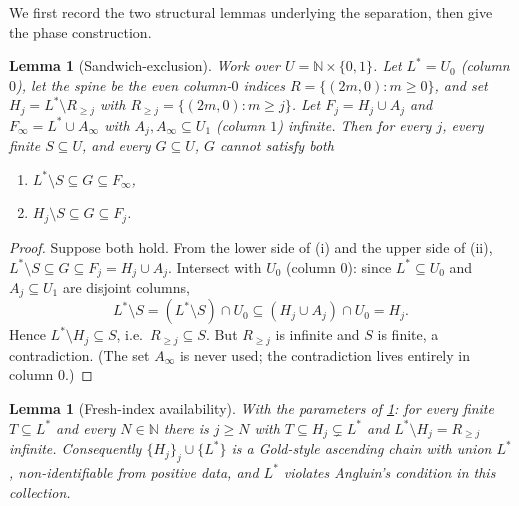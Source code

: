 \documentclass[11pt]{article}
\numberwithin{equation}{section}
\newcommand{\N}{\mathbb{N}}
\newcommand{\gnd}{U}
\newcommand{\Amb}{F}
\newcommand{\Val}{H}
\newcommand{\Seen}{S}
\theoremstyle{plain}
\newtheorem{lemma}[theorem]{Lemma}
\theoremstyle{definition}
\theoremstyle{remark}
\begin{document}
We first record the two structural lemmas underlying the separation, then give the phase
construction.

\begin{lemma}[Sandwich-exclusion]\label{lem:sandwich}
Work over $\gnd = \N \times \{0,1\}$. Let $L^* = \gnd_0$ (column $0$), let the spine be the
even column-$0$ indices $R = \{(2m, 0) : m \ge 0\}$, and set $\Val_j = L^* \setminus R_{\ge
j}$ with $R_{\ge j} = \{(2m, 0) : m \ge j\}$. Let $\Amb_j = \Val_j \cup A_j$ and $\Amb_\infty
= L^* \cup A_\infty$ with $A_j, A_\infty \subseteq \gnd_1$ (column $1$) infinite. Then for
every $j$, every finite $\Seen \subseteq \gnd$, and every $G \subseteq \gnd$, $G$ cannot
satisfy both
\begin{enumerate}[label=\textup{(\roman*)}]
  \item $L^* \setminus \Seen \subseteq G \subseteq \Amb_\infty$,
  \item $\Val_j \setminus \Seen \subseteq G \subseteq \Amb_j$.
\end{enumerate}
\end{lemma}

\begin{proof}
Suppose both hold. From the lower side of (i) and the upper side of (ii), $L^* \setminus \Seen
\subseteq G \subseteq \Amb_j = \Val_j \cup A_j$. Intersect with $\gnd_0$ (column $0$): since
$L^* \subseteq \gnd_0$ and $A_j \subseteq \gnd_1$ are disjoint columns,
\begin{equation*}
  L^* \setminus \Seen = (L^* \setminus \Seen) \cap \gnd_0
  \subseteq (\Val_j \cup A_j) \cap \gnd_0 = \Val_j .
\end{equation*}
Hence $L^* \setminus \Val_j \subseteq \Seen$, i.e.\ $R_{\ge j} \subseteq \Seen$. But $R_{\ge
j}$ is infinite and $\Seen$ is finite, a contradiction. (The set $A_\infty$ is never used; the
contradiction lives entirely in column $0$.)
\end{proof}

\begin{lemma}[Fresh-index availability]\label{lem:fresh}
With the parameters of \cref{lem:sandwich}: for every finite $T \subseteq L^*$ and every $N
\in \N$ there is $j \ge N$ with $T \subseteq \Val_j \subsetneq L^*$ and $L^* \setminus \Val_j
= R_{\ge j}$ infinite. Consequently $\{\Val_j\}_j \cup \{L^*\}$ is a Gold-style ascending
chain with union $L^*$, non-identifiable from positive data, and $L^*$ violates Angluin's
condition in this collection.
\end{lemma}
\end{document}
